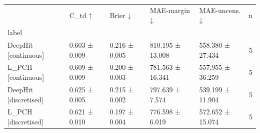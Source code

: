 \begin{tabular}{lllllr}
\toprule
 & C\_td ↑ & Brier ↓ & MAE-margin ↓ & MAE-uncens. ↓ & n \\
label &  &  &  &  &  \\
\midrule
DeepHit [continuous] & 0.603 ± 0.009 & 0.216 ± 0.005 & 810.195 ± 13.008 & 558.380 ± 27.434 & 5 \\
L\_PCH [continuous] & 0.609 ± 0.009 & 0.200 ± 0.003 & 781.563 ± 16.341 & 557.955 ± 36.259 & 5 \\
DeepHit [discretised] & 0.625 ± 0.005 & 0.215 ± 0.002 & 797.639 ± 7.574 & 539.199 ± 11.904 & 5 \\
L\_PCH [discretised] & 0.621 ± 0.010 & 0.197 ± 0.004 & 776.598 ± 6.019 & 572.652 ± 15.074 & 5 \\
\bottomrule
\end{tabular}
